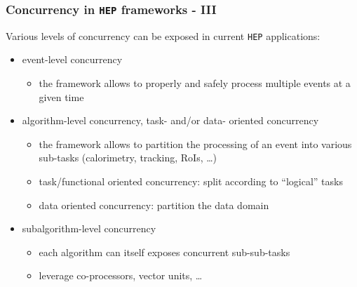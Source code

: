 \documentclass[9pt]{beamer}
\begin{document}
\begin{frame}[fragile]
\frametitle{Concurrency in \verb~HEP~ frameworks - III}


Various levels of concurrency can be exposed in current \verb~HEP~ applications:

\begin{itemize}
\item \alert{event-level} concurrency
\begin{itemize}
\item the framework allows to properly and safely process multiple events
    at a given time
\end{itemize}
\item \alert{algorithm-level} concurrency, \alert{task-} and/or \alert{data-} oriented concurrency
\begin{itemize}
\item the framework allows to partition the processing of an event into various
    sub-tasks (calorimetry, tracking, RoIs, \ldots{})
\item \alert{task/functional} oriented concurrency: split according to ``logical'' tasks
\item \alert{data} oriented concurrency: partition the data domain
\end{itemize}
\item \alert{subalgorithm-level} concurrency
\begin{itemize}
\item each algorithm can itself exposes concurrent sub-sub-tasks
\item leverage co-processors, vector units, \ldots{}
\end{itemize}
\end{itemize}
\end{frame}
\end{document}

